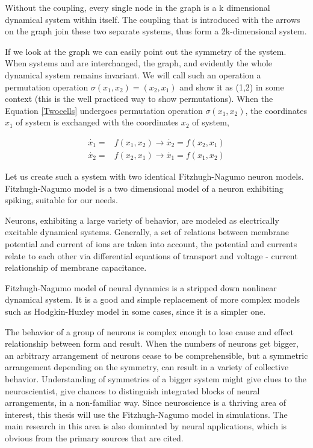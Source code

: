 Without the coupling, every single node in the graph is a k dimensional dynamical system within itself. The coupling that is introduced with the arrows on the graph join these two separate systems, thus form a 2k-dimensional system.

If we look at the graph we can easily point out the symmetry of the system. When systems  and  are interchanged, the graph, and evidently the whole dynamical system remains invariant. We will call such an operation a permutation operation $\sigma (x_1,x_2)=(x_2,x_1)$ and show it as (1,2) in some context (this is the well practiced way to show permutations). When the Equation \ref{Twocells} undergoes permutation operation $\sigma (x_1,x_2)$, the coordinates $x_1$ of system  is exchanged with the coordinates $x_2$ of system,

\begin{align}
\dot{x_1}=&f(x_1,x_2)\rightarrow \dot{x_2}=f(x_2,x_1)\\
\dot{x_2}=&f(x_2,x_1)\rightarrow \dot{x_1}=f(x_1,x_2)
\end{align}


Let us create such a system with two identical Fitzhugh-Nagumo neuron models. Fitzhugh-Nagumo model is a two dimensional model of a neuron exhibiting spiking, suitable for our needs. 

Neurons, exhibiting a large variety of behavior, are modeled as electrically excitable dynamical systems. Generally, a set of relations between membrane potential and current of ions are taken into account, the potential and currents relate to each other via differential equations of transport and  voltage - current relationship of membrane capacitance. 

Fitzhugh-Nagumo model of neural dynamics is a stripped down nonlinear dynamical system. It is a good and simple replacement of more complex models such as Hodgkin-Huxley model in some cases, since it is a simpler one. 

The behavior of a group of neurons is complex enough to lose cause and effect relationship between form and result. When the numbers of neurons get bigger, an arbitrary arrangement of neurons cease to be comprehensible, but a symmetric arrangement depending on the symmetry, can result in a variety of collective behavior. Understanding of symmetries of a bigger system might give clues to the neuroscientist, give chances to distinguish integrated blocks of neural arrangements, in a non-familiar way. Since neuroscience is a thriving area of interest, this thesis will use the Fitzhugh-Nagumo model in simulations. \cite{fitzhugh1961impulses} The main research in this area is also dominated by neural applications, which is obvious from the primary sources that are cited.

